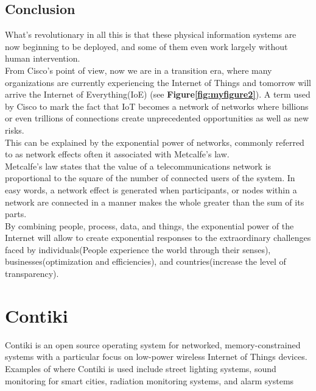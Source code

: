 \documentclass[a4paper,10pt]{article}
\begin{document}
\begin{multicols}{2}
\subsection{Conclusion}


What’s revolutionary in all this is that these physical information systems are now 
beginning to be deployed, and some of them even work largely without human intervention.\\
\cite{cisco12}  From Cisco's point of view, now we are in a transition era, where many
 organizations are currently experiencing the Internet of Things and tomorrow will arrive
 the Internet of Everything(IoE)  (see {\bf Figure\ref{fig:myfigure2}}).
A term used by Cisco to mark the fact that IoT becomes a network of networks where
 billions or even trillions of connections create unprecedented opportunities as well as
 new risks.\\ This can be explained by the exponential power of networks, commonly
 referred to as network effects often it associated with Metcalfe’s law.\\
 Metcalfe's law states that the value of a telecommunications network is proportional 
to the square of the number of connected users of the system. In easy words, a network
 effect is generated when participants, or nodes within a network are connected in a
 manner makes the whole greater than the sum of its parts.\\ By combining people,
 process, data, and things, the exponential power of the Internet will allow to create
 exponential responses to the extraordinary challenges faced by individuals(People
 experience the world through their senses), businesses(optimization and efficiencies),
 and countries(increase the level of transparency).




\section{Contiki}

\cite{wiki} Contiki is an open source operating system for networked, 
memory-constrained systems with a particular focus on low-power wireless
 Internet of Things devices.\\ Examples of where Contiki is used include street
 lighting systems, sound monitoring for smart cities, radiation monitoring systems,
 and alarm systems


\end{multicols}
\end{document}
